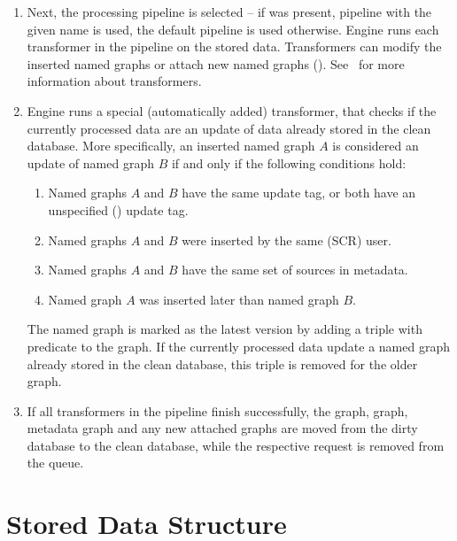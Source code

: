 \begin{enumerate}
  \item Next, the processing pipeline is selected -- if  was present, pipeline with the given name is used, the default pipeline is used otherwise. Engine runs each transformer in the pipeline on the stored data. Transformers can modify the inserted named graphs or attach new named graphs (). See~ for more information about transformers.

  \item \label{item:updateDetection}
    Engine runs a special (automatically added) transformer, that checks if the currently processed data are an update of data already stored in the clean database. More specifically, an inserted named graph $A$ is considered an update of named graph $B$ if and only if the following conditions hold:

	\begin{enumerate}[label=(\emph{\roman*})]
	  \item Named graphs $A$ and $B$ have the same update tag, or both have an unspecified () update tag.
	  \item Named graphs $A$ and $B$ were inserted by the same (SCR) user.
	  \item Named graphs $A$ and $B$ have the same set of sources in metadata.
	  \item Named graph $A$ was inserted later than named graph $B$.
	\end{enumerate}

	The  named graph is marked as the latest version by adding a triple with predicate  to the  graph. If the currently processed data update a named graph already stored in the clean database, this triple is removed for the older graph.

  \item If all transformers in the pipeline finish successfully, the  graph,  graph, metadata graph and any new attached graphs are moved from the dirty database to the clean database, while the respective request is removed from the queue.


\end{enumerate}

\section{Stored Data Structure}
\label{sec:storedDataStructure}

